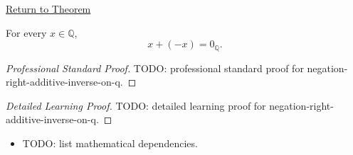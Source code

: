 \newpage
{}
\label{prf:negation-right-additive-inverse-on-q}

\begin{remark*}[Return]
\hyperref[cor:negation-right-additive-inverse-on-q]{Return to Theorem}
\end{remark*}

\begin{corollary*}
For every $x\in\mathbb{Q}$,
\[
x+(-x)=0_{\mathbb{Q}}.
\]
\end{corollary*}

\begin{proof}[Professional Standard Proof]
\LRAProofBodyStart
TODO: professional standard proof for negation-right-additive-inverse-on-q.
\end{proof}

\begin{proof}[Detailed Learning Proof]
\LRAProofBodyStart
TODO: detailed learning proof for negation-right-additive-inverse-on-q.
\end{proof}

\begin{remark*}
\end{remark*}

\begin{dependencies}
\begin{itemize}
  \item TODO: list mathematical dependencies.
\end{itemize}
\end{dependencies}

\clearpage
